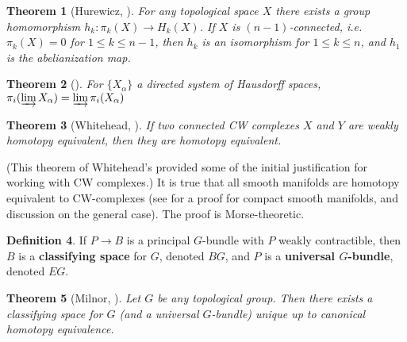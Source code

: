 \documentclass{report}
\theoremstyle{plain}
\newtheorem{theorem}{Theorem}[section]
\theoremstyle{definition}
\newtheorem{definition}[theorem]{Definition}
\theoremstyle{remark}
\begin{document}
\begin{theorem}[Hurewicz, {\cite[Section 20.1]{Dieck2008}}]
  For any topological space $X$ there exists a group homomorphism
  $h_k\colon \pi_k(X) \to H_k(X)$. If $X$ is $(n-1)$-connected, i.e.
  $\pi_k(X) = 0$ for $1 \le k \le n-1$, then $h_k$ is an isomorphism
  for $1 \le k \le n$, and $h_1$ is the abelianization map.
\end{theorem}

\begin{theorem}[{\cite[Section 10.8]{Dieck2008}}] \label{thm:homotopy-injlim}
  For $\{X_\alpha\}$ a directed system of Hausdorff
  spaces, $\pi_i (\varinjlim X_\alpha) = \varinjlim \pi_i(X_\alpha)$
\end{theorem}

\begin{theorem}[Whitehead, {\cite[Theorem 20.1.5]{Dieck2008}}]
  If two connected CW complexes $X$ and $Y$ are weakly homotopy
  equivalent, then they are homotopy equivalent.
\end{theorem}

(This theorem of Whitehead's provided some of the initial
justification for working with CW complexes.) It is true that all
smooth manifolds are homotopy equivalent to CW-complexes (see
\cite[page 220]{Bott1982} for a proof for compact smooth manifolds,
and discussion on the general case). The proof is Morse-theoretic.

\begin{definition}
  If $P \to B$ is a principal $G$-bundle with $P$ weakly contractible,
  then $B$ is a {\bf classifying space} for $G$, denoted $BG$, and $P$
  is a {\bf universal $G$-bundle}, denoted $EG$.
\end{definition}

\begin{theorem}[Milnor, {\cite[Section 14.4]{Dieck2008}}] \label{thm:classifying-space}
  Let $G$ be any topological group. Then there exists a classifying
  space for $G$ (and a universal $G$-bundle) unique up to canonical
  homotopy equivalence.
\end{theorem}
\end{document}
